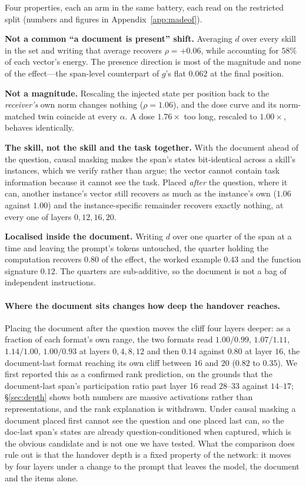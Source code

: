 \documentclass{article}
\newcommand{\dvec}{\ensuremath{d}}
\newcommand{\gvec}{\ensuremath{g}}
\begin{document}
Four properties, each an arm in the same battery, each read on the restricted
split (numbers and figures in Appendix~\ref{app:madeof}).

\textbf{Not a common ``a document is present'' shift.} Averaging $\dvec$ over
every skill in the set and writing that average recovers $\rho = +0.06$, while
accounting for $58\%$ of each vector's energy. The presence direction is most of
the magnitude and none of the effect---the span-level counterpart of $\gvec$'s
flat $0.062$ at the final position.

\textbf{Not a magnitude.} Rescaling the injected state per position back to the
\emph{receiver's} own norm changes nothing ($\rho = 1.06$), and the dose curve
and its norm-matched twin coincide at every $\alpha$. A dose $1.76\times$ too
long, rescaled to $1.00\times$, behaves identically.

\textbf{The skill, not the skill and the task together.} With the document ahead
of the question, causal masking makes the span's states bit-identical across a
skill's instances, which we verify rather than argue; the vector cannot contain
task information because it cannot see the task. Placed \emph{after} the
question, where it can, another instance's vector still recovers as much as the
instance's own ($1.06$ against $1.00$) and the instance-specific remainder
recovers exactly nothing, at every one of layers $0, 12, 16, 20$.

\textbf{Localised inside the document.} Writing $\dvec$ over one quarter of the
span at a time and leaving the prompt's tokens untouched, the quarter holding
the computation recovers $0.80$ of the effect, the worked example $0.43$ and the
function signature $0.12$. The quarters are sub-additive, so the document is not
a bag of independent instructions.

\paragraph{Where the document sits changes how deep the handover reaches.}
Placing the document after the question moves the cliff four layers deeper: as a
fraction of each format's own range, the two formats read $1.00/0.99$,
$1.07/1.11$, $1.14/1.00$, $1.00/0.93$ at layers $0, 4, 8, 12$ and then
$\mathbf{0.14}$ against $\mathbf{0.80}$ at layer $16$, the document-last format
reaching its own cliff between $16$ and $20$ ($0.82$ to $0.35$). We first
reported this as a confirmed rank prediction, on the grounds that the
document-last span's participation ratio past layer 16 read $28$--$33$ against
$14$--$17$; \S\ref{sec:depth} shows both numbers are massive activations rather
than representations, and the rank explanation is withdrawn. Under causal
masking a document placed first cannot see the question and one placed last can,
so the doc-last span's states are already question-conditioned when captured,
which is the obvious candidate and is not one we have tested. What the
comparison does rule out is that the handover depth is a fixed property of the
network: it moves by four layers under a change to the prompt that leaves the
model, the document and the items alone.
\end{document}
